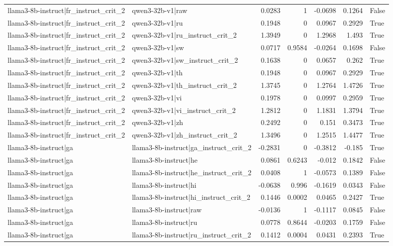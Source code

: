 \begin{table}
\begin{tabular}{l l r r r r l}
llama3-8b-instruct|fr_instruct_crit_2 & qwen3-32b-v1|raw & 0.0283 & 1 & -0.0698 & 0.1264 & False \\
llama3-8b-instruct|fr_instruct_crit_2 & qwen3-32b-v1|ru & 0.1948 & 0 & 0.0967 & 0.2929 & True \\
llama3-8b-instruct|fr_instruct_crit_2 & qwen3-32b-v1|ru_instruct_crit_2 & 1.3949 & 0 & 1.2968 & 1.493 & True \\
llama3-8b-instruct|fr_instruct_crit_2 & qwen3-32b-v1|sw & 0.0717 & 0.9584 & -0.0264 & 0.1698 & False \\
llama3-8b-instruct|fr_instruct_crit_2 & qwen3-32b-v1|sw_instruct_crit_2 & 0.1638 & 0 & 0.0657 & 0.262 & True \\
llama3-8b-instruct|fr_instruct_crit_2 & qwen3-32b-v1|th & 0.1948 & 0 & 0.0967 & 0.2929 & True \\
llama3-8b-instruct|fr_instruct_crit_2 & qwen3-32b-v1|th_instruct_crit_2 & 1.3745 & 0 & 1.2764 & 1.4726 & True \\
llama3-8b-instruct|fr_instruct_crit_2 & qwen3-32b-v1|vi & 0.1978 & 0 & 0.0997 & 0.2959 & True \\
llama3-8b-instruct|fr_instruct_crit_2 & qwen3-32b-v1|vi_instruct_crit_2 & 1.2812 & 0 & 1.1831 & 1.3794 & True \\
llama3-8b-instruct|fr_instruct_crit_2 & qwen3-32b-v1|zh & 0.2492 & 0 & 0.151 & 0.3473 & True \\
llama3-8b-instruct|fr_instruct_crit_2 & qwen3-32b-v1|zh_instruct_crit_2 & 1.3496 & 0 & 1.2515 & 1.4477 & True \\
llama3-8b-instruct|ga & llama3-8b-instruct|ga_instruct_crit_2 & -0.2831 & 0 & -0.3812 & -0.185 & True \\
llama3-8b-instruct|ga & llama3-8b-instruct|he & 0.0861 & 0.6243 & -0.012 & 0.1842 & False \\
llama3-8b-instruct|ga & llama3-8b-instruct|he_instruct_crit_2 & 0.0408 & 1 & -0.0573 & 0.1389 & False \\
llama3-8b-instruct|ga & llama3-8b-instruct|hi & -0.0638 & 0.996 & -0.1619 & 0.0343 & False \\
llama3-8b-instruct|ga & llama3-8b-instruct|hi_instruct_crit_2 & 0.1446 & 0.0002 & 0.0465 & 0.2427 & True \\
llama3-8b-instruct|ga & llama3-8b-instruct|raw & -0.0136 & 1 & -0.1117 & 0.0845 & False \\
llama3-8b-instruct|ga & llama3-8b-instruct|ru & 0.0778 & 0.8644 & -0.0203 & 0.1759 & False \\
llama3-8b-instruct|ga & llama3-8b-instruct|ru_instruct_crit_2 & 0.1412 & 0.0004 & 0.0431 & 0.2393 & True \\

\end{tabular}
\end{table}

